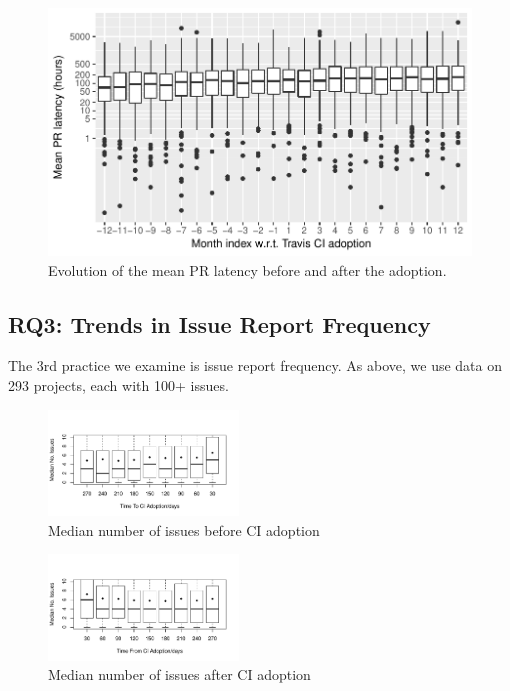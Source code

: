 \begin{figure}[t]
\centering
\includegraphics[width=\columnwidth, clip=true, trim=0 0 0 0]{figures/pr-latency-mean.pdf}
\caption{Evolution of the mean PR latency before and after the \Tvis adoption.}
\label{fig:pr-latency}
\end{figure}








\subsection{RQ3: Trends in Issue Report Frequency}

The 3rd practice we examine is issue report frequency.
As above, we use data on 293 projects, each with 
100+ issues.

\begin{figure}[t]
\centering
\includegraphics[width=0.45\textwidth, clip=true, trim=0 15 15 50]{issues_before.pdf}
\caption{Median number of issues before CI adoption}
\label{Fig:IssuesBefore}
\end{figure}


\begin{figure}[t]
\centering
\includegraphics[width=0.45\textwidth, clip=true, trim=0 15 15 50]{issues_after.pdf}
\caption{Median number of issues after CI adoption}
\label{Fig:IssuesAfter}
\end{figure}

